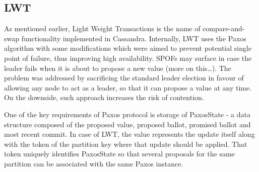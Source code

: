 

\subsection{LWT}\label{sec:theory:transactions:lwt}
As mentioned earlier, Light Weight Transactions is the name of compare-and-swap functionality implemented in Cassandra. Internally, LWT uses the Paxos algorithm with some modifications which were aimed to prevent potential single point of failure, thus improving high availability. SPOFs may surface in case the leader fails when it is about to propose a new value (more on this…). The problem was addressed by sacrificing the standard leader election in favour of allowing any node to act as a leader, so that it can propose a value at any time. On the downside, such approach increases the risk of contention. 

One of the key requirements of Paxos protocol is storage of PaxosState - a data structure composed of the proposed value, proposed ballot, promised ballot and most recent commit. In case of LWT, the value represents the update itself along with the token of the partition key where that update should be applied. That token uniquely identifies PaxosState so that several proposals for the same partition can be associated with the same Paxos instance. 


